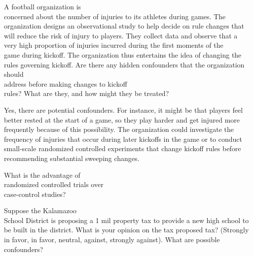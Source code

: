 \documentclass[11pt]{book}\usepackage[]{graphicx}\usepackage[]{color}
\begin{document}
\begin{exercises}
  \begin{exercise} %

A football organization is \\ concerned about the number of injuries to its athletes during games. The organization designs an observational study to help decide on rule changes that will reduce the risk of injury to players. They collect data and observe that a very high proportion of injuries incurred during the first moments of the \\ game during kickoff. The organization thus entertains the idea of changing the rules governing kickoff. Are there any hidden confounders that the organization should \\ address before making changes to  kickoff \\ rules? What are they, and how might they be treated?

	\end{exercise}
	\begin{solution}  %

Yes, there are potential confounders. For instance, it might be that players feel better rested at the start of a game, so they play harder and get injured more frequently because of this possibility. The organization could investigate the frequency of injuries that occur during later kickoffs in the game or to conduct small-scale randomized controlled experiments that change kickoff rules before recommending substantial sweeping changes.

	\end{solution}

	  \begin{exercise} %

What is the advantage of \\ randomized controlled trials over \\ case-control studies?

  \end{exercise}

	  \begin{exercise} %

Suppose the Kalamazoo \\ School District is proposing a 1 mil property tax to provide a new high school to be built in the district.  What is your opinion on the tax proposed tax?  (Strongly in favor, in favor, neutral, against, strongly against).  What are possible confounders?

  \end{exercise}

  

\end{exercises}
\end{document}
